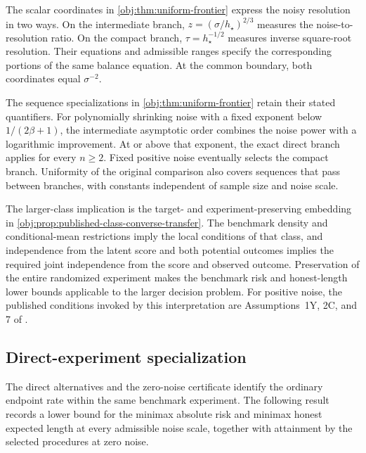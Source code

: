\documentclass[11pt]{article}
\begin{document}
The scalar coordinates in \cref{obj:thm:uniform-frontier} express the noisy resolution in two ways. On the intermediate branch, \(z=(\sigma/h_\star)^{2/3}\) measures the noise-to-resolution ratio. On the compact branch, \(\tau=h_\star^{-1/2}\) measures inverse square-root resolution. Their equations and admissible ranges specify the corresponding portions of the same balance equation. At the common boundary, both coordinates equal \(\sigma^{-2}\).

The sequence specializations in \cref{obj:thm:uniform-frontier} retain their stated quantifiers. For polynomially shrinking noise with a fixed exponent below \(1/(2\beta+1)\), the intermediate asymptotic order combines the noise power with a logarithmic improvement. At or above that exponent, the exact direct branch applies for every \(n\ge2\). Fixed positive noise eventually selects the compact branch. Uniformity of the original comparison also covers sequences that pass between branches, with constants independent of sample size and noise scale.

The larger-class implication is the target- and experiment-preserving embedding in \cref{obj:prop:published-class-converse-transfer}. The benchmark density and conditional-mean restrictions imply the local conditions of that class, and independence from the latent score and both potential outcomes implies the required joint independence from the score and observed outcome. Preservation of the entire randomized experiment makes the benchmark risk and honest-length lower bounds applicable to the larger decision problem. For positive noise, the published conditions invoked by this interpretation are Assumptions~1Y, 2C, and 7 of \citet{PeiShen2017DevilTails}.

\subsection{Direct-experiment specialization}

The direct alternatives and the zero-noise certificate identify the ordinary endpoint rate within the same benchmark experiment. The following result records a lower bound for the minimax absolute risk  and minimax honest expected length  at every admissible noise scale, together with attainment by the selected procedures at zero noise.
\end{document}
